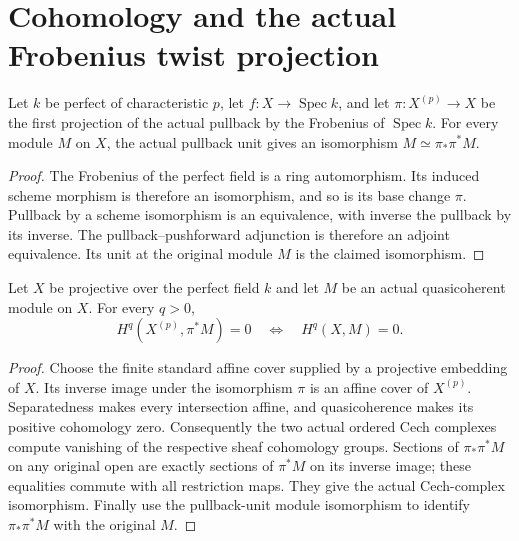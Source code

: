 \section{Cohomology and the actual Frobenius twist projection}

\begin{lemma}
\label{lem:kn-frobenius-twist-module-unit}
\leanok
Let $k$ be perfect of characteristic $p$, let $f:X\to\operatorname{Spec}k$,
and let $\pi:X^{(p)}\to X$ be the first projection of the actual pullback
by the Frobenius of $\operatorname{Spec}k$.  For every module $M$ on $X$,
the actual pullback unit gives an isomorphism
$M\simeq\pi_*\pi^*M$.
\end{lemma}
\begin{proof}
The Frobenius of the perfect field is a ring automorphism.  Its induced
scheme morphism is therefore an isomorphism, and so is its base change
$\pi$.  Pullback by a scheme isomorphism is an equivalence, with inverse
the pullback by its inverse.  The pullback--pushforward adjunction is
therefore an adjoint equivalence.  Its unit at the original module $M$
is the claimed isomorphism.
\end{proof}

\begin{theorem}
\label{thm:kn-frobenius-twist-module-cohomology}
\leanok
{}
Let $X$ be projective over the perfect field $k$ and let $M$ be an
actual quasicoherent module on $X$.  For every $q>0$,
\[
 H^q(X^{(p)},\pi^*M)=0\quad\Longleftrightarrow\quad H^q(X,M)=0.
\]
\end{theorem}
\begin{proof}
Choose the finite standard affine cover supplied by a projective
embedding of $X$.  Its inverse image under the isomorphism $\pi$ is
an affine cover of $X^{(p)}$.  Separatedness makes every intersection
affine, and quasicoherence makes its positive cohomology zero.
Consequently the two actual ordered Cech complexes compute vanishing
of the respective sheaf cohomology groups.  Sections of $\pi_*\pi^*M$
on any original open are exactly sections of $\pi^*M$ on its inverse
image; these equalities commute with all restriction maps.  They give
the actual Cech-complex isomorphism.  Finally use the pullback-unit
module isomorphism to identify $\pi_*\pi^*M$ with the original $M$.
\end{proof}

